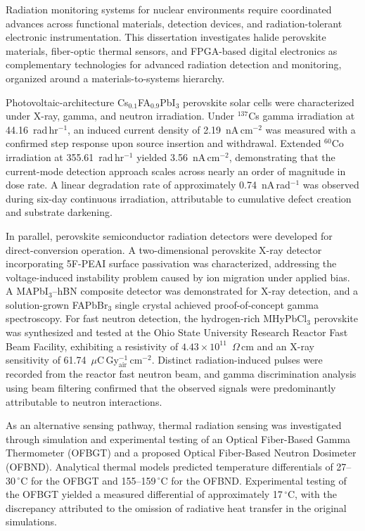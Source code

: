 
Radiation monitoring systems for nuclear environments require coordinated advances across functional materials, detection devices, and radiation-tolerant electronic instrumentation. This dissertation investigates halide perovskite materials, fiber-optic thermal sensors, and FPGA-based digital electronics as complementary technologies for advanced radiation detection and monitoring, organized around a materials-to-systems hierarchy.

Photovoltaic-architecture Cs$_{0.1}$FA$_{0.9}$PbI$_3$ perovskite solar cells were characterized under X-ray, gamma, and neutron irradiation. Under $^{137}$Cs gamma irradiation at 44.16~rad\,hr$^{-1}$, an induced current density of 2.19~nA\,cm$^{-2}$ was measured with a confirmed step response upon source insertion and withdrawal. Extended $^{60}$Co irradiation at 355.61~rad\,hr$^{-1}$ yielded 3.56~nA\,cm$^{-2}$, demonstrating that the current-mode detection approach scales across nearly an order of magnitude in dose rate. A linear degradation rate of approximately 0.74~nA\,rad$^{-1}$ was observed during six-day continuous irradiation, attributable to cumulative defect creation and substrate darkening.

In parallel, perovskite semiconductor radiation detectors were developed for direct-conversion operation. A two-dimensional perovskite X-ray detector incorporating 5F-PEAI surface passivation was characterized, addressing the voltage-induced instability problem caused by ion migration under applied bias. A MAPbI$_3$--hBN composite detector was demonstrated for X-ray detection, and a solution-grown FAPbBr$_3$ single crystal achieved proof-of-concept gamma spectroscopy. For fast neutron detection, the hydrogen-rich MHyPbCl$_3$ perovskite was synthesized and tested at the Ohio State University Research Reactor Fast Beam Facility, exhibiting a resistivity of $4.43 \times 10^{11}$~$\Omega$\,cm and an X-ray sensitivity of 61.74~$\mu$C\,Gy$_{\mathrm{air}}^{-1}$\,cm$^{-2}$. Distinct radiation-induced pulses were recorded from the reactor fast neutron beam, and gamma discrimination analysis using beam filtering confirmed that the observed signals were predominantly attributable to neutron interactions.

As an alternative sensing pathway, thermal radiation sensing was investigated through simulation and experimental testing of an Optical Fiber-Based Gamma Thermometer (OFBGT) and a proposed Optical Fiber-Based Neutron Dosimeter (OFBND). Analytical thermal models predicted temperature differentials of 27--30$\,^{\circ}$C for the OFBGT and 155--159$\,^{\circ}$C for the OFBND. Experimental testing of the OFBGT yielded a measured differential of approximately 17$\,^{\circ}$C, with the discrepancy attributed to the omission of radiative heat transfer in the original simulations.

